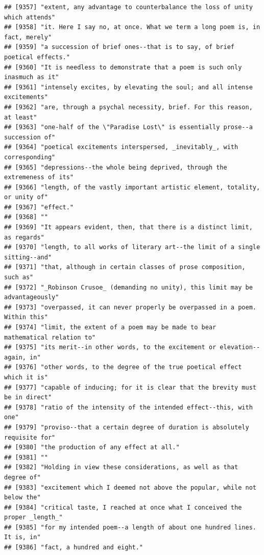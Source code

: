 \documentclass{article}\usepackage[]{graphicx}\usepackage[]{color}
\makeatletter
\newenvironment{kframe}{%
 \def\at@end@of@kframe{}%
 \ifinner\ifhmode%
  \def\at@end@of@kframe{\end{minipage}}%
  \begin{minipage}{\columnwidth}%
 \fi\fi%
 \def\FrameCommand##1{\hskip\@totalleftmargin \hskip-\fboxsep
 \colorbox{shadecolor}{##1}\hskip-\fboxsep
     \hskip-\linewidth \hskip-\@totalleftmargin \hskip\columnwidth}%
 \MakeFramed {\advance\hsize-\width
   \@totalleftmargin\z@ \linewidth\hsize
   \@setminipage}}%
 {\par\unskip\endMakeFramed%
 \at@end@of@kframe}
\newenvironment{knitrout}{}{} %
\makeatother
\begin{document}
\begin{knitrout}
\begin{kframe}
\begin{verbatim}
## [9357] "extent, any advantage to counterbalance the loss of unity which attends"     
## [9358] "it. Here I say no, at once. What we term a long poem is, in fact, merely"    
## [9359] "a succession of brief ones--that is to say, of brief poetical effects."      
## [9360] "It is needless to demonstrate that a poem is such only inasmuch as it"       
## [9361] "intensely excites, by elevating the soul; and all intense excitements"       
## [9362] "are, through a psychal necessity, brief. For this reason, at least"          
## [9363] "one-half of the \"Paradise Lost\" is essentially prose--a succession of"     
## [9364] "poetical excitements interspersed, _inevitably_, with corresponding"         
## [9365] "depressions--the whole being deprived, through the extremeness of its"       
## [9366] "length, of the vastly important artistic element, totality, or unity of"     
## [9367] "effect."                                                                     
## [9368] ""                                                                            
## [9369] "It appears evident, then, that there is a distinct limit, as regards"        
## [9370] "length, to all works of literary art--the limit of a single sitting--and"    
## [9371] "that, although in certain classes of prose composition, such as"             
## [9372] "_Robinson Crusoe_ (demanding no unity), this limit may be advantageously"    
## [9373] "overpassed, it can never properly be overpassed in a poem. Within this"      
## [9374] "limit, the extent of a poem may be made to bear mathematical relation to"    
## [9375] "its merit--in other words, to the excitement or elevation--again, in"        
## [9376] "other words, to the degree of the true poetical effect which it is"          
## [9377] "capable of inducing; for it is clear that the brevity must be in direct"     
## [9378] "ratio of the intensity of the intended effect--this, with one"               
## [9379] "proviso--that a certain degree of duration is absolutely requisite for"      
## [9380] "the production of any effect at all."                                        
## [9381] ""                                                                            
## [9382] "Holding in view these considerations, as well as that degree of"             
## [9383] "excitement which I deemed not above the popular, while not below the"        
## [9384] "critical taste, I reached at once what I conceived the proper _length_"      
## [9385] "for my intended poem--a length of about one hundred lines. It is, in"        
## [9386] "fact, a hundred and eight."                                                  

\end{verbatim}
\end{kframe}
\end{knitrout}
\end{document}
